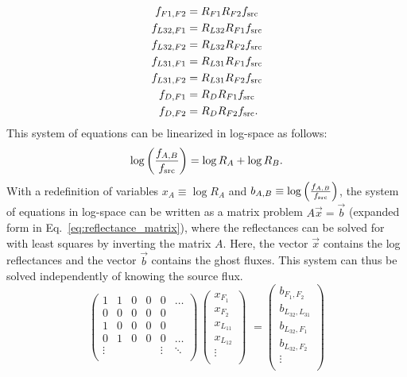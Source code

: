 \begin{equation}
\label{eq:coupled_eqs}
\begin{aligned}
f_{F1 , F2} &= R_{F1} R_{F2} f_{\rm src} \\
f_{L{32} , F1} &= R_{L{32}} R_{F1} f_{\rm src} \\
f_{L{32} , F2} &= R_{L{32}} R_{F2} f_{\rm src} \\
f_{L{31} , F1} &= R_{L{31}} R_{F1} f_{\rm src} \\
f_{L{31} , F2} &= R_{L{31}} R_{F2} f_{\rm src} \\
f_{D , F1} &= R_{D} R_{F1} f_{\rm src} \\
f_{D , F2} &= R_{D} R_{F2} f_{\rm src}.
\end{aligned}
\end{equation}
\noindent This system of equations can be linearized in log-space as follows:
\begin{equation}
    \label{eq:log-coupled-eqs}
    \log\left(\frac{f_{A,B}}{f_{\rm src}}\right) = \log R_A + \log R_B.
\end{equation}
With a redefinition of variables $x_A \equiv \log R_A$ and $b_{A,B} \equiv \log \left(\frac{f_{A,B}}{f_{\rm src}}\right)$, the system of equations in log-space can be written as a matrix problem $A\vec{x} = \vec{b}$ (expanded form in Eq.~\ref{eq:reflectance_matrix}), where the reflectances can be solved for with least squares by inverting the matrix $A$. 
Here, the vector $\vec{x}$ contains the log reflectances and the vector $\vec{b}$ contains the ghost fluxes.
This system can thus be solved independently of knowing the source flux.
\begin{equation}
\label{eq:reflectance_matrix}
\begin{pmatrix}
1 & 1 & 0 & 0 & 0 & \dots \\
0 & 0 & 0 & 0 & 0 & \\
1 & 0 & 0 & 0 & 0 &  \\
0 & 1 & 0 & 0 & 0 & \dots \\
\vdots & & & & \vdots & \ddots \\
\end{pmatrix} \, 
\begin{pmatrix}
x_{F_1} \\
x_{F_2} \\
x_{L_{11}} \\
x_{L_{12}} \\
\vdots \\
\end{pmatrix}\,\,
=
\begin{pmatrix}
b_{F_1 , F_2} \\
b_{L_{32} , L_{31}} \\
b_{L_{32} , F_1} \\
b_{L_{32} , F_2} \\
\vdots \\
\end{pmatrix}
\end{equation}

